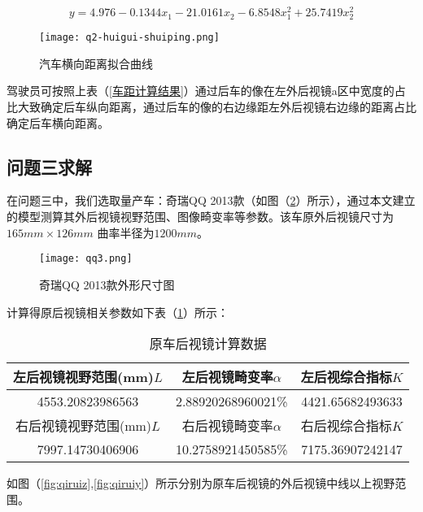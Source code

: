 \documentclass[withoutpreface,bwprint]{cumcmthesis} %
\begin{document}
\begin{equation}
	y = 4.976 - 0.1344 x_1 -21.0161 x_2 - 6.8548 x_1^2 + 25.7419 x_2^2
\end{equation}



\begin{figure}[h]
\small
\centering
\texttt{[image: q2-huigui-shuiping.png]}
\caption{汽车横向距离拟合曲线} \label{q2-huigui-shuiping}
\end{figure}


\par 驾驶员可按照上表（\ref{车距计算结果}）通过后车的像在左外后视镜a区中宽度的占比大致确定后车纵向距离，通过后车的像的右边缘距左外后视镜右边缘的距离占比确定后车横向距离。


\subsection{问题三求解}
\par 在问题三中，我们选取量产车：奇瑞QQ 2013款（如图（\ref{fig:qq3}）所示），通过本文建立的模型测算其外后视镜视野范围、图像畸变率等参数。该车原外后视镜尺寸为$165mm \times 126mm$ 曲率半径为$1200mm$。
\begin{figure}[h]
\small
\centering
\texttt{[image: qq3.png]}
\caption{奇瑞QQ 2013款外形尺寸图} \label{fig:qq3}
\end{figure}

计算得原后视镜相关参数如下表（\ref{原车后视镜计算数据}）所示：
\begin{table}[!htbp]
\centering
\caption{原车后视镜计算数据}
\label{原车后视镜计算数据}
\begin{tabular}{|c|c|c|}
\toprule
左后视镜视野范围(mm)$L$ & 左后视镜畸变率$\alpha$ & 左后视综合指标$K$ \\ \hline 
4553.20823986563 & 2.88920268960021\%  & 4421.65682493633 \\ \hline 


右后视镜视野范围(mm)$L$ & 右后视镜畸变率$\alpha$  & 右后视综合指标$K$ \\ \hline
7997.14730406906 & 10.2758921450585\%  &  7175.36907242147 \\

\bottomrule 
\end{tabular}

\end{table}
\par 如图（\ref{fig:qiruiz},\ref{fig:qiruiy}）所示分别为原车后视镜的外后视镜中线以上视野范围。
\end{document}
